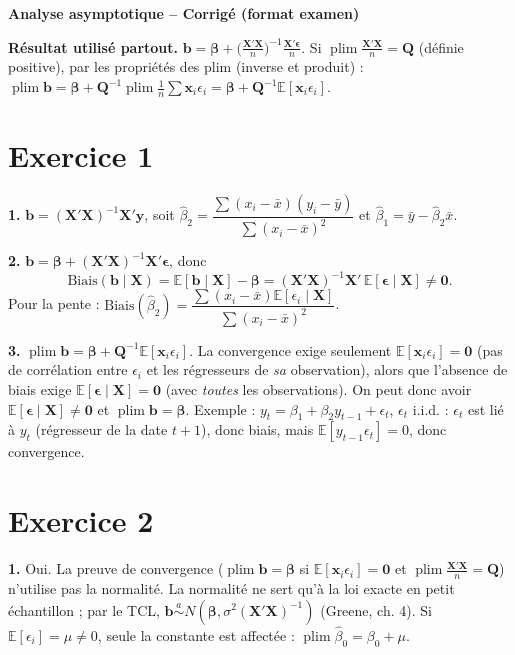 \documentclass[11pt,a4paper]{article}
\newcommand{\vy}{\mathbf{y}}\newcommand{\vX}{\mathbf{X}}\newcommand{\vb}{\mathbf{b}}\newcommand{\vx}{\mathbf{x}}
\newcommand{\vbeta}{\bm{\beta}}\newcommand{\veps}{\bm{\epsilon}}\newcommand{\Q}{\mathbf{Q}}
\newcommand{\E}{\mathbb{E}}\newcommand{\Var}{\operatorname{Var}}\newcommand{\Cov}{\operatorname{Cov}}
\newcommand{\plim}{\operatorname{plim}}
\begin{document}
\begin{center}
{\Large\bfseries Analyse asymptotique -- Corrigé (format examen)}
\end{center}

\textbf{Résultat utilisé partout.} $\vb=\vbeta+\big(\frac{\vX'\vX}{n}\big)^{-1}\frac{\vX'\veps}{n}$. Si $\plim\frac{\vX'\vX}{n}=\Q$ (définie positive), par les propriétés des plim (inverse et produit) : $\plim\vb=\vbeta+\Q^{-1}\plim\frac1n\sum\vx_i\epsilon_i=\vbeta+\Q^{-1}\E[\vx_i\epsilon_i]$.

\section*{Exercice 1}

\textbf{1.} $\vb=(\vX'\vX)^{-1}\vX'\vy$, soit $\hat\beta_2=\dfrac{\sum(x_i-\bar x)(y_i-\bar y)}{\sum(x_i-\bar x)^2}$ et $\hat\beta_1=\bar y-\hat\beta_2\bar x$.

\textbf{2.} $\vb=\vbeta+(\vX'\vX)^{-1}\vX'\veps$, donc
\[
\text{Biais}(\vb\mid\vX)=\E[\vb\mid\vX]-\vbeta=(\vX'\vX)^{-1}\vX'\,\E[\veps\mid\vX]\neq\mathbf 0 .
\]
Pour la pente : $\text{Biais}(\hat\beta_2)=\dfrac{\sum(x_i-\bar x)\E[\epsilon_i\mid\vX]}{\sum(x_i-\bar x)^2}$.

\textbf{3.} $\plim\vb=\vbeta+\Q^{-1}\E[\vx_i\epsilon_i]$. La convergence exige seulement $\E[\vx_i\epsilon_i]=\mathbf 0$ (pas de corrélation entre $\epsilon_i$ et les régresseurs de \emph{sa} observation), alors que l'absence de biais exige $\E[\veps\mid\vX]=\mathbf 0$ (avec \emph{toutes} les observations). On peut donc avoir $\E[\veps\mid\vX]\neq\mathbf 0$ et $\plim\vb=\vbeta$. Exemple : $y_t=\beta_1+\beta_2y_{t-1}+\epsilon_t$, $\epsilon_t$ i.i.d. : $\epsilon_t$ est lié à $y_t$ (régresseur de la date $t+1$), donc biais, mais $\E[y_{t-1}\epsilon_t]=0$, donc convergence.

\section*{Exercice 2}

\textbf{1.} Oui. La preuve de convergence ($\plim\vb=\vbeta$ si $\E[\vx_i\epsilon_i]=\mathbf 0$ et $\plim\frac{\vX'\vX}{n}=\Q$) n'utilise pas la normalité. La normalité ne sert qu'à la loi exacte en petit échantillon ; par le TCL, $\vb\overset{a}{\sim}N(\vbeta,\sigma^2(\vX'\vX)^{-1})$ (Greene, ch. 4). Si $\E[\epsilon_i]=\mu\neq0$, seule la constante est affectée : $\plim\hat\beta_0=\beta_0+\mu$.
\end{document}
